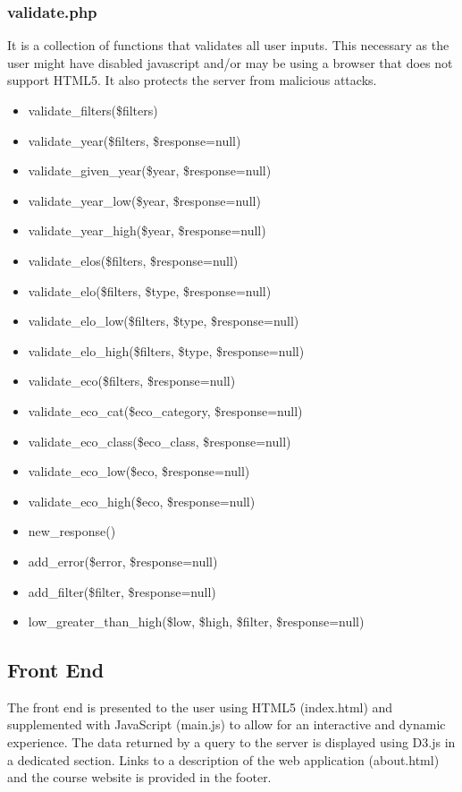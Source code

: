 \documentclass{article}
\begin{document}
\subsubsection{validate.php}
It is a collection of functions that validates all user inputs. This necessary
as the user might have disabled javascript and/or may be using a browser that
does not support HTML5. It also protects the server from malicious attacks.
\begin{itemize}
	\item validate\_filters(\$filters)
	\item validate\_year(\$filters, \$response=null)
	\item validate\_given\_year(\$year, \$response=null)
	\item validate\_year\_low(\$year, \$response=null)
	\item validate\_year\_high(\$year, \$response=null)
	\item validate\_elos(\$filters, \$response=null)
	\item validate\_elo(\$filters, \$type, \$response=null)
	\item validate\_elo\_low(\$filters, \$type, \$response=null)
	\item validate\_elo\_high(\$filters, \$type, \$response=null)
	\item validate\_eco(\$filters, \$response=null)
	\item validate\_eco\_cat(\$eco\_category, \$response=null)
	\item validate\_eco\_class(\$eco\_class, \$response=null)
	\item validate\_eco\_low(\$eco, \$response=null)
	\item validate\_eco\_high(\$eco, \$response=null)
	\item new\_response()
	\item add\_error(\$error, \$response=null)
	\item add\_filter(\$filter, \$response=null)
	\item low\_greater\_than\_high(\$low, \$high, \$filter, \$response=null)
\end{itemize}

\subsection{Front End}
The front end is presented to the user using HTML5 (index.html) and
supplemented with JavaScript (main.js) to allow for an interactive and
dynamic experience.  The data returned by a query to the server is
displayed using D3.js in a dedicated section.  Links to a description
of the web application (about.html) and the course
website is provided in the footer.
\end{document}
